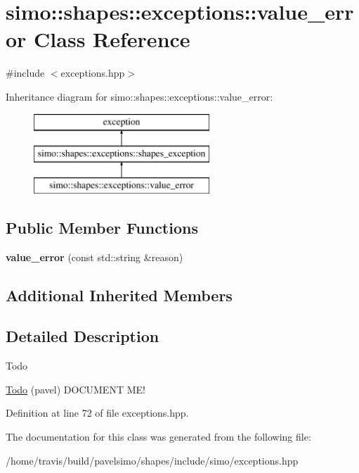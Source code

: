 \hypertarget{classsimo_1_1shapes_1_1exceptions_1_1value__error}{\section{simo\-:\-:shapes\-:\-:exceptions\-:\-:value\-\_\-error Class Reference}
\label{classsimo_1_1shapes_1_1exceptions_1_1value__error}
}


{\ttfamily \#include $<$exceptions.\-hpp$>$}

Inheritance diagram for simo\-:\-:shapes\-:\-:exceptions\-:\-:value\-\_\-error\-:\begin{figure}[H]
\begin{center}
\leavevmode
\includegraphics[height=3.000000cm]{classsimo_1_1shapes_1_1exceptions_1_1value__error}
\end{center}
\end{figure}
\subsection*{Public Member Functions}
\begin{DoxyCompactItemize}
\item 
\hypertarget{classsimo_1_1shapes_1_1exceptions_1_1value__error_a016a1db56ac487d44ee9bea79fe9e57e}{{\bfseries value\-\_\-error} (const std\-::string \&reason)}\label{classsimo_1_1shapes_1_1exceptions_1_1value__error_a016a1db56ac487d44ee9bea79fe9e57e}

\end{DoxyCompactItemize}
\subsection*{Additional Inherited Members}


\subsection{Detailed Description}
\begin{DoxyRefDesc}{Todo}
\item[\hyperlink{todo__todo000003}{Todo}](pavel) D\-O\-C\-U\-M\-E\-N\-T M\-E! \end{DoxyRefDesc}


Definition at line 72 of file exceptions.\-hpp.



The documentation for this class was generated from the following file\-:\begin{DoxyCompactItemize}
\item 
/home/travis/build/pavelsimo/shapes/include/simo/exceptions.\-hpp\end{DoxyCompactItemize}
